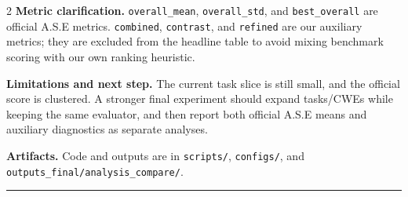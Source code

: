 \documentclass[10pt]{article}
\begin{document}
\begin{multicols}{2}
\textbf{Metric clarification.}
\texttt{overall\_mean}, \texttt{overall\_std}, and \texttt{best\_overall} are official A.S.E metrics. \texttt{combined}, \texttt{contrast}, and \texttt{refined} are our auxiliary metrics; they are excluded from the headline table to avoid mixing benchmark scoring with our own ranking heuristic.

\textbf{Limitations and next step.}
The current task slice is still small, and the official score is clustered. A stronger final experiment should expand tasks/CWEs while keeping the same evaluator, and then report both official A.S.E means and auxiliary diagnostics as separate analyses.

\textbf{Artifacts.}
Code and outputs are in \texttt{scripts/}, \texttt{configs/}, and \texttt{outputs\_final/analysis\_compare/}.

\end{multicols}

\vspace{0.45em}
\hrule
\vspace{0.45em}
\end{document}
